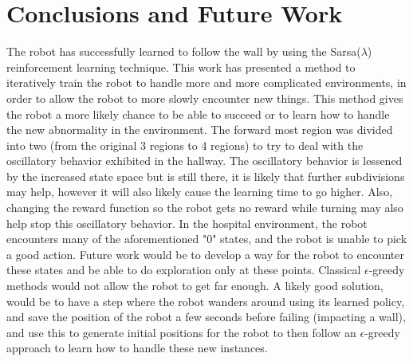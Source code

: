 \documentclass[letterpaper, 10 pt, conference]{ieeeconf}  %
\begin{document}
\section{Conclusions and Future Work}
The robot has successfully learned to follow the wall by using the Sarsa($\lambda$) reinforcement learning technique.
This work has presented a method to iteratively train the robot to handle more and more complicated environments, in order to allow the robot to more slowly encounter new things.
This method gives the robot a more likely chance to be able to succeed or to learn how to handle the new abnormality in the environment.  
The forward most region was divided into two (from the original 3 regions to 4 regions) to try to deal with the oscillatory behavior exhibited in the hallway. 
The oscillatory behavior is lessened by the increased state space but is still there, it is likely that further subdivisions may help, however it will also likely cause the learning time to go higher.
Also, changing the reward function so the robot gets no reward while turning may also help stop this oscillatory behavior.
In the hospital environment, the robot encounters many of the aforementioned "0" states, and the robot is unable to pick a good action. 
Future work would be to develop a way for the robot to encounter these states and be able to do exploration only at these points. 
Classical $\epsilon$-greedy methods would not allow the robot to get far enough. 
A likely good solution, would be to have a step where the robot wanders around using its learned policy, and save the position of the robot a few seconds before failing (impacting a wall), and use this to generate initial positions for the robot to then follow an $\epsilon$-greedy approach to learn how to handle these new instances. 





%
\end{document}
